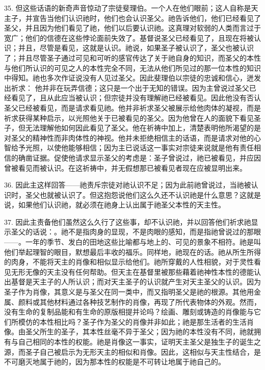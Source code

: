 35. 但这些话语的新奇声音惊动了宗徒斐理伯。一个人在他们眼前；这人自称是天主子，并宣告当他们认识祂时，他们也会认识圣父。祂告诉他们，他们已经看见了圣父，并且因为他们看见了祂，他们以后要认识祂。这真理对软弱的人类而言过于宽广；他们的信德在这些悖论面前失效了。基督说圣父已经看见了，且现在将被认识；并且，尽管是看见，这就是认识。祂说，如果圣子被认识了，圣父也被认识了；并且尽管圣子通过可见和可听的感官传达了关于祂自身的知识，而圣父的本性与他们所认识的可见之人的本性完全不同，无法从他们所见过的那一位本性的知识中得知。祂也多次作证说没有人见过圣父。因此斐理伯以宗徒的忠诚和信心，迸发出祈求： 他并非在玩弄信德；这只是一个出于无知的错误。因为主曾说过圣父已经看见了，且从此应当被认识；但宗徒并没有理解祂已经被看见。因此他没有否认圣父已经被看见，而是请求看见祂。他并非祈求圣父被展示给他肉体的凝视，而是祈求获得某种启示，以光照他关于已被看见的圣父。因为他曾在人的面貌下看见圣子，但无法理解他如何因此看见了圣父。他在祈祷中加上，清楚表明他所渴望的是对圣父的精神性而非肉体性的神视。他并未拒绝相信主的话语，而是请求对他的心智给予光照，以使他能够相信；因为主已说话这一事实对宗徒来说就是他有责任相信的确凿证据。促使他请求显示圣父的考虑是：圣子曾说过，祂已被看见，并应因曾被看见而被认识。在这祈祷中，并无假想那已被看见者现在应被显明出来。\par

36. 因此主这样回答——祂责斥宗徒对祂认识不足；因为此前祂曾说过，当祂被认识时，圣父也就被认识了。但这抱怨说他们这么久还不认识祂是什么意思？这就是说，如果他们认识祂，就必须在祂身上认出属于祂圣父本性的天主性。\par

37. 因此主责备他们虽然这么久行了这些事，却不认识祂，并以回答他们祈求祂显示圣父的话说：。祂不是指肉身的显现，不是肉眼的感知，而是指祂曾说过的那眼——。一年的季节、发白的田地这些比喻都与地上的、可见的景象不相符。祂是叫他们举起理智的眼目，默想最后丰收的福乐。同样地，祂现在的话。祂从所生所得的肉身，不能将天主的肖像和相似显示给他们。祂所穿戴的人性相貌，对于灵性看见无形无像的天主没有任何帮助。但天主在基督里被那些藉着祂神性本性的德能认出基督是天主子的人所认识；而对天主圣子的认识就产生对天主圣父的认识。因为圣子作为肖像，其意义是与圣父在同一类中，而又指明圣父是祂的根源。其他用金属、颜料或其他材料通过各种技艺制作的肖像，再现了所代表物体的外观。然而，没有生命的复制品能和有生命的原版相提并论吗？绘画、雕刻或铸造的肖像能与它们所模仿的本性相比吗？圣子作为圣父的肖像并非如此；祂是那生活者的生活肖像。由圣父所生的圣子，其本性丝毫不异于圣父；因为祂的本性没有不同，祂就拥有与自己相同的本性的权能。祂是肖像这一事实，证明天主圣父是独生子的诞生之源，而圣子自己被启示为无形天主的相似和肖像。因此，这相似与天主性结合，是不可磨灭地属于祂的，因为那本性的权能是不可转让地属于祂自己的。\par

